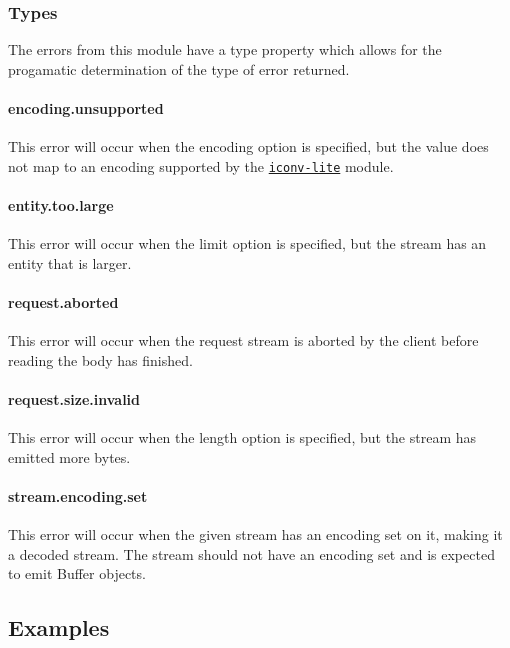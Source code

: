 \subsubsection*{Types}

The errors from this module have a {\ttfamily type} property which allows for the progamatic determination of the type of error returned.

\paragraph*{encoding.\+unsupported}

This error will occur when the {\ttfamily encoding} option is specified, but the value does not map to an encoding supported by the \href{https://www.npmjs.org/package/iconv-lite#readme}{\tt iconv-\/lite} module.

\paragraph*{entity.\+too.\+large}

This error will occur when the {\ttfamily limit} option is specified, but the stream has an entity that is larger.

\paragraph*{request.\+aborted}

This error will occur when the request stream is aborted by the client before reading the body has finished.

\paragraph*{request.\+size.\+invalid}

This error will occur when the {\ttfamily length} option is specified, but the stream has emitted more bytes.

\paragraph*{stream.\+encoding.\+set}

This error will occur when the given stream has an encoding set on it, making it a decoded stream. The stream should not have an encoding set and is expected to emit {\ttfamily Buffer} objects.

\subsection*{Examples}

